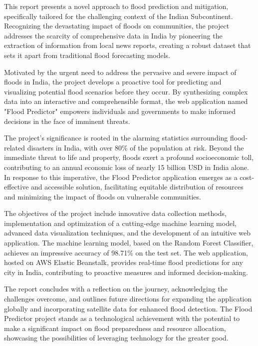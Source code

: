 \documentclass[a4paper,12pt]{report}
\begin{document}

This report presents a novel approach to flood prediction and mitigation, specifically tailored for the challenging context of the Indian Subcontinent. Recognizing the devastating impact of floods on communities, the project addresses the scarcity of comprehensive data in India by pioneering the extraction of information from local news reports, creating a robust dataset that sets it apart from traditional flood forecasting models.

Motivated by the urgent need to address the pervasive and severe impact of floods in India, the project develops a proactive tool for predicting and visualizing potential flood scenarios before they occur. By synthesizing complex data into an interactive and comprehensible format, the web application named "Flood Predictor" empowers individuals and governments to make informed decisions in the face of imminent threats.

The project's significance is rooted in the alarming statistics surrounding flood-related disasters in India, with over 80\% of the population at risk. Beyond the immediate threat to life and property, floods exert a profound socioeconomic toll, contributing to an annual economic loss of nearly 15 billion USD in India alone. In response to this imperative, the Flood Predictor application emerges as a cost-effective and accessible solution, facilitating equitable distribution of resources and minimizing the impact of floods on vulnerable communities.

The objectives of the project include innovative data collection methods, implementation and optimization of a cutting-edge machine learning model, advanced data visualization techniques, and the development of an intuitive web application. The machine learning model, based on the Random Forest Classifier, achieves an impressive accuracy of 98.71\% on the test set. The web application, hosted on AWS Elastic Beanstalk, provides real-time flood predictions for any city in India, contributing to proactive measures and informed decision-making.

The report concludes with a reflection on the journey, acknowledging the challenges overcome, and outlines future directions for expanding the application globally and incorporating satellite data for enhanced flood detection. The Flood Predictor project stands as a technological achievement with the potential to make a significant impact on flood preparedness and resource allocation, showcasing the possibilities of leveraging technology for the greater good.
\end{document}
